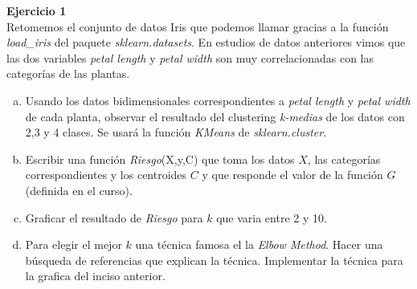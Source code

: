 \documentclass[a4paper, 11pt]{article}
\newenvironment{problem}[2][Ejercicio]
{ \begin{mdframed}[backgroundcolor= red!50] \textbf{#1 #2} \\}
	{  \end{mdframed}}
\begin{document}
	\setlength{\parskip}{\medskipamount}
	\setlength{\parindent}{0pt}
 
\begin{problem}{1} 
    Retomemos el conjunto de datos Iris que podemos llamar gracias a la función \textit{load\_iris} del paquete \textit{sklearn.datasets}. En estudios de datos anteriores vimos que las dos variables \textit{petal length} y \textit{petal width} son muy correlacionadas con las categorías de las plantas.
    \begin{enumerate}[a)]
        \item Usando los datos bidimensionales correspondientes a \textit{petal length} y \textit{petal width} de cada planta, observar el resultado del clustering \textit{k-medias} de los datos con 2,3 y 4 clases. Se usará la función \textit{KMeans} de \textit{sklearn.cluster}.
        \item Escribir una función \textit{Riesgo}(X,y,C) que toma los datos $X$, las categorías correspondientes y los centroides $C$ y que responde el valor de la función $G$ (definida en el curso).
        \item Graficar el resultado de \textit{Riesgo} para $k$ que varia entre 2 y 10. 
        \item Para elegir el mejor $k$ una técnica famosa el la \textit{Elbow Method}. Hacer una búsqueda de referencias que explican la técnica. Implementar la técnica para la grafica del inciso anterior.
    \end{enumerate}

\end{problem}
\end{document}
